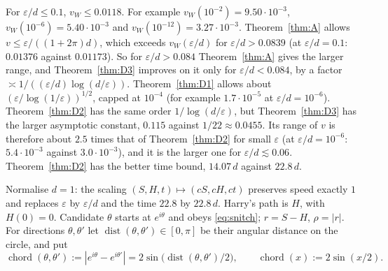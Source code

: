 For $\varepsilon/d\le0.1$, $v_W\le0.0118$. For example $v_W(10^{-2})=9.50\cdot10^{-3}$, $v_W(10^{-6})=5.40\cdot10^{-3}$ and
$v_W(10^{-12})=3.27\cdot10^{-3}$. Theorem~\ref{thm:A} allows $v\le\varepsilon/((1+2\pi)d)$, which exceeds $v_W(\varepsilon/d)$ for
$\varepsilon/d>0.0839$ (at $\varepsilon/d=0.1$: $0.01376$ against $0.01173$). So for $\varepsilon/d>0.084$ Theorem~\ref{thm:A} gives the
larger range, and Theorem~\ref{thm:D3} improves on it only for $\varepsilon/d<0.084$, by a factor
$\asymp1/((\varepsilon/d)\log(d/\varepsilon))$. Theorem~\ref{thm:D1} allows about $(\varepsilon/\log(1/\varepsilon))^{1/2}$, capped
at $10^{-4}$ (for example $1.7\cdot10^{-5}$ at $\varepsilon/d=10^{-6}$). Theorem~\ref{thm:D2} has the same order
$1/\log(d/\varepsilon)$, but Theorem~\ref{thm:D3} has the larger asymptotic constant, $0.115$ against $1/22\approx0.0455$. Its range
of $v$ is therefore about $2.5$ times that of Theorem~\ref{thm:D2} for small $\varepsilon$ (at $\varepsilon/d=10^{-6}$:
$5.4\cdot10^{-3}$ against $3.0\cdot10^{-3}$), and it is the larger one for $\varepsilon/d\lesssim0.06$. Theorem~\ref{thm:D2} has the
better time bound, $14.07\,d$ against $22.8\,d$.

\medskip
Normalise $d=1$: the scaling $(S,H,t)\mapsto(cS,cH,ct)$ preserves speed exactly $1$ and replaces $\varepsilon$ by $\varepsilon/d$
and the time $22.8$ by $22.8\,d$. Harry's path is $H$, with $H(0)=0$. Candidate $\theta$ starts at $e^{i\theta}$ and obeys
\eqref{eq:snitch}; $r=S-H$, $\rho=|r|$. For directions $\theta,\theta'$ let $\operatorname{dist}(\theta,\theta')\in[0,\pi]$ be
their angular distance on the circle, and put
\[
\operatorname{chord}(\theta,\theta'):=|e^{i\theta}-e^{i\theta'}|=2\sin\bigl(\operatorname{dist}(\theta,\theta')/2\bigr),
\qquad \operatorname{chord}(x):=2\sin(x/2).
\]

